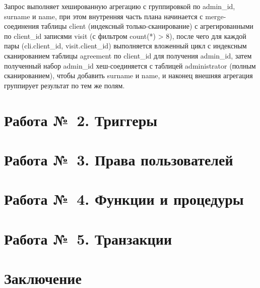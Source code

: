 \documentclass[11pt, a4paper]{article}
\begin{document}
		Запрос выполняет хешированную агрегацию с группировкой по admin\_id, surname и name, при этом внутренняя часть плана начинается с merge-соединения таблицы client (индексный только-сканирование) с агрегированными по client\_id записями visit (с фильтром count(*) > 8), после чего для каждой пары (cli.client\_id, visit.client\_id) выполняется вложенный цикл с индексным сканированием таблицы agreement по client\_id для получения admin\_id, затем полученный набор admin\_id хеш-соединяется с таблицей administrator (полным сканированием), чтобы добавить surname и name, и наконец внешняя агрегация группирует результат по тем же полям.
	
	
	
	\newpage
	\section{Работа №~2. Триггеры}
	\hfill
	
	
	\section{Работа №~3. Права пользователей}
	\hfill
	
	
	
	\section{Работа №~4. Функции и процедуры}
	\hfill
	
	
	
	\section{Работа №~5. Транзакции}
	\hfill
	
	
	
	\newpage
	\section*{Заключение}
	
	
	
	
	
	
	
	
\end{document}
